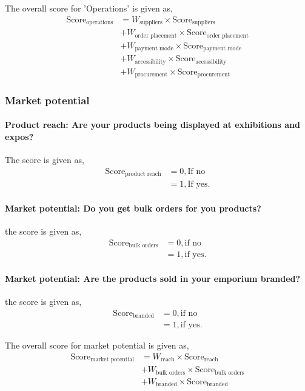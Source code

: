 \documentclass[oneside,twocolumn]{article}
\newcommand{\tsub}[2]{\text{#1}_{\text{#2}}}
\newcommand{\tsubb}[2]{#1_{\text{#2}}}
\begin{document}
The overall score for 'Operations' is given as,
\begin{align*}
	\tsub{Score}{operations} &= \tsubb{W}{suppliers} \times \tsub{Score}{suppliers} \\
	&+ \tsubb{W}{order placement} \times \tsub{Score}{order placement} \\
	&+ \tsubb{W}{payment mode} \times \tsub{Score}{payment mode} \\
	&+ \tsubb{W}{accessibility} \times \tsub{Score}{accessibility} \\
	&+ \tsubb{W}{procurement} \times \tsub{Score}{procurement}
\end{align*}
\subsubsection{Market potential}
\paragraph{Product reach: Are your products being displayed at exhibitions and expos?}
The score is given as,
\begin{align*}
	\tsub{Score}{product reach} &= 0, \text{If no} \\
	&= 1, \text{If yes}.
\end{align*}
\paragraph{Market potential: Do you get bulk orders for you products?}
the score is given as,
\begin{align*}
	\tsub{Score}{bulk orders} &= 0, \text{if no} \\
	&= 1, \text{if yes}.
\end{align*}
\paragraph{Market potential: Are the products sold in your emporium branded?}
the score is given as,
\begin{align*}
	\tsub{Score}{branded} &= 0, \text{if no} \\
	&= 1, \text{if yes}.
\end{align*}

The overall score for market potential is given as,
\begin{align*}
	\tsub{Score}{market potential} &= \tsubb{W}{reach} \times \tsub{Score}{reach} \\
	&+ \tsubb{W}{bulk orders} \times \tsub{Score}{bulk orders} \\
	&+ \tsubb{W}{branded} \times \tsub{Score}{branded}
\end{align*}
\end{document}
